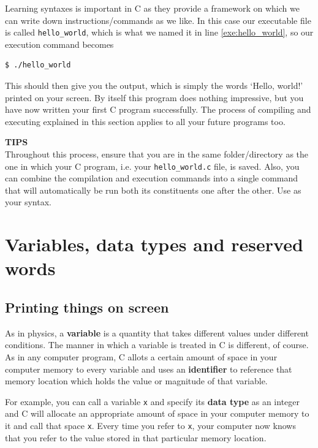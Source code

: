 \documentclass[11pt,oneside]{article}
\newcommand{\eb}[1]{\textbf{\scriptsize{\sffamily\addfontfeatures{LetterSpace=7} #1\\[.35em]}}}
\begin{document}
Learning syntaxes is important in C as they provide a framework on which we can write down instructions/commands as we like. In this case our executable file is called \verb+hello_world+, which is what we named it in line \ref{exe:hello_world}, so our execution command becomes

\begin{lstlisting}
$ ./hello_world
\end{lstlisting}
This should then give you the output, which is simply the words `Hello, world!' printed on your screen. By itself this program does nothing impressive, but you have now written your first C program successfully. The process of compiling and executing explained in this section applies to all your future programs too.

\begin{errorbox}
\eb{TIPS }
Throughout this process, ensure that you are in the same folder/directory as the one in which your C program, i.e. your \verb+hello_world.c+ file, is saved. Also, you can combine the compilation and execution commands into a single command that will automatically be run both its constituents one after the other. Use  as your syntax.
\end{errorbox}

\section{Variables, data types and reserved words}
\subsection{Printing things on screen}

As in physics, a \textbf{variable} is a quantity that takes different values under different conditions. The manner in which a variable is treated in C is different, of course. As in any computer program, C allots a certain amount of space in your computer memory to every variable and uses an \textbf{identifier} to reference that memory location which holds the value or magnitude of that variable.

For example, you can call a variable \verb+x+ and specify its \textbf{data type} as an integer and C will allocate an appropriate amount of space in your computer memory to it and call that space \verb+x+. Every time you refer to \verb+x+, your computer now knows that you refer to the value stored in that particular memory location.
\end{document}
